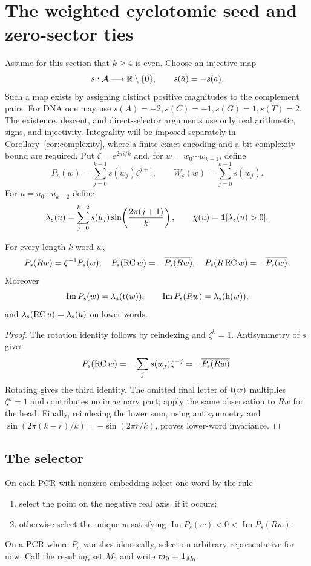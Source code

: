 \section{The weighted cyclotomic seed and zero-sector ties}
\label{sec:seed}

Assume for this section that $k\geq4$ is even.  Choose an injective map
\[
  s:\mathcal A\longrightarrow\mathbb R\setminus\{0\},
  \qquad s(\bar a)=-s(a).
\]
Such a map exists by assigning distinct positive magnitudes to the
complement pairs.  For DNA one may use
$s(A)=-2,s(C)=-1,s(G)=1,s(T)=2$.
The existence, descent, and direct-selector arguments use only real
arithmetic, signs, and injectivity.  Integrality will be imposed separately
in Corollary~\ref{cor:complexity}, where a finite exact encoding and a bit
complexity bound are required.
Put $\zeta=e^{2\pi i/k}$ and, for $w=w_0\cdots w_{k-1}$, define
\[
  P_s(w)=\sum_{j=0}^{k-1}s(w_j)\zeta^{j+1},
  \qquad W_s(w)=\sum_{j=0}^{k-1}s(w_j).
\]
For $u=u_0\cdots u_{k-2}$ define
\[
  \lambda_s(u)=\sum_{j=0}^{k-2}s(u_j)
    \sin\!\left(\frac{2\pi(j+1)}k\right),
  \qquad \chi(u)=\mathbf 1[\lambda_s(u)>0].
\]

\begin{lemma}
\label{lem:covariance}
For every length-$k$ word $w$,
\[
  P_s(Rw)=\zeta^{-1}P_s(w),\quad
  P_s(\operatorname{RC} w)=-\overline{P_s(Rw)},\quad
  P_s(R\operatorname{RC} w)=-\overline{P_s(w)}.
\]
Moreover
\[
  \operatorname{Im}P_s(w)=\lambda_s(\operatorname{t}(w)),\qquad
  \operatorname{Im}P_s(Rw)=\lambda_s(\operatorname{h}(w)),
\]
and $\lambda_s(\operatorname{RC} u)=\lambda_s(u)$ on lower words.
\end{lemma}

\begin{proof}
The rotation identity follows by reindexing and $\zeta^k=1$.  Antisymmetry
of $s$ gives
\[
  P_s(\operatorname{RC} w)
  =-\sum_j s(w_j)\zeta^{-j}
  =-\overline{P_s(Rw)}.
\]
Rotating gives the third identity.  The omitted final letter of
$\operatorname{t}(w)$ multiplies $\zeta^k=1$ and contributes no imaginary part; apply
the same observation to $Rw$ for the head.  Finally, reindexing the lower
sum, using antisymmetry and
$\sin(2\pi(k-r)/k)=-\sin(2\pi r/k)$, proves lower-word invariance.
\end{proof}

\subsection{The selector}

On each PCR with nonzero embedding select one word by the rule
\begin{enumerate}
  \item select the point on the negative real axis, if it occurs;
  \item otherwise select the unique $w$ satisfying
  $\operatorname{Im}P_s(w)<0<\operatorname{Im}P_s(Rw)$.
\end{enumerate}
On a PCR where $P_s$ vanishes identically, select an arbitrary representative
for now.  Call the resulting set $M_0$ and write $m_0=\mathbf 1_{M_0}$.

